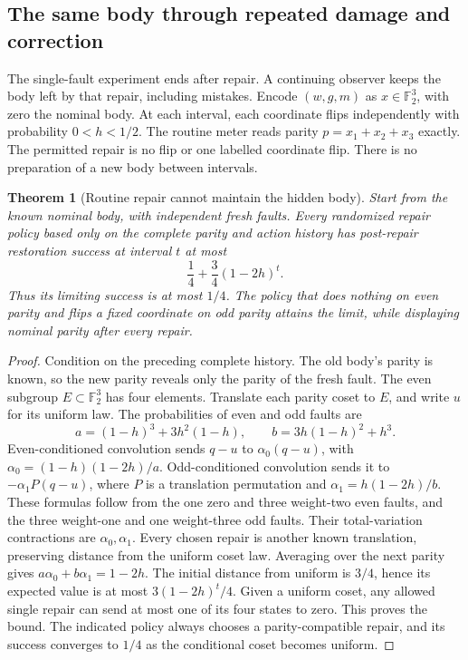 \documentclass[12pt]{article}
\newtheorem{theorem}{Theorem}[section]
\theoremstyle{definition}
\theoremstyle{remark}
\begin{document}
\subsection{The same body through repeated damage and correction}
\label{sec:recurrent-body}

The single-fault experiment ends after repair. A continuing observer keeps
the body left by that repair, including mistakes. Encode $(w,g,m)$ as
$x\in\mathbb F_2^3$, with zero the nominal body. At each interval,
each coordinate flips independently with probability $0<h<1/2$.
The routine meter reads parity $p=x_1+x_2+x_3$ exactly.
The permitted repair is no flip or one labelled coordinate flip.
There is no preparation of a new body between intervals.

\begin{theorem}[Routine repair cannot maintain the hidden body]
\label{thm:recurrent-routine}
Start from the known nominal body, with independent fresh faults.
Every randomized repair policy based only on the complete parity and
action history has post-repair restoration success at interval $t$ at most
\begin{equation}\label{eq:recurrent-routine}
 \frac14+\frac34(1-2h)^t.
\end{equation}
Thus its limiting success is at most $1/4$. The policy that does nothing
on even parity and flips a fixed coordinate on odd parity attains the
limit, while displaying nominal parity after every repair.
\end{theorem}
\begin{proof}
Condition on the preceding complete history. The old body's parity is
known, so the new parity reveals only the parity of the fresh fault.
The even subgroup $E\subset\mathbb F_2^3$ has four elements. Translate
each parity coset to $E$, and write $u$ for its uniform law. The
probabilities of even and odd faults are
\[
 a=(1-h)^3+3h^2(1-h),\qquad b=3h(1-h)^2+h^3.
\]
Even-conditioned convolution sends $q-u$ to $\alpha_0(q-u)$, with
$\alpha_0=(1-h)(1-2h)/a$. Odd-conditioned convolution sends it to
$-\alpha_1P(q-u)$, where $P$ is a translation permutation and
$\alpha_1=h(1-2h)/b$. These formulas follow from the one zero
and three weight-two even faults, and the three weight-one and
one weight-three odd faults. Their total-variation contractions are
$\alpha_0,\alpha_1$.
Every chosen repair is another known translation, preserving distance
from the uniform coset law. Averaging over the next parity gives
$a\alpha_0+b\alpha_1=1-2h$. The initial distance from uniform is
$3/4$, hence its expected value is at most
$3(1-2h)^t/4$. Given a uniform coset, any allowed single repair can
send at most one of its four states to zero. This proves the bound.
The indicated policy always chooses a parity-compatible repair, and
its success converges to $1/4$ as the conditional coset becomes uniform.
\end{proof}
\end{document}
